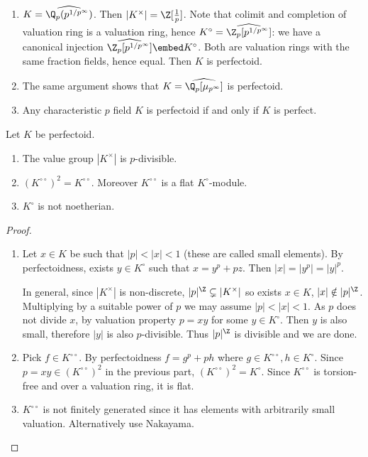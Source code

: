 \documentclass[a4paper]{article}
\begin{document}
\begin{eg}\leavevmode
  \begin{enumerate}
  \item \(K = \widehat{\Q_p(p^{1/p^\infty})}\). Then \(|K^\times| = \Z[\frac{1}{p}]\). Note that colimit and completion of valuation ring is a valuation ring, hence \(K^\circ = \widehat{\Z_p[p^{1/p^\infty}]}\): we have a canonical injection \(\widehat{\Z_p[p^{1/p^\infty}]} \embed K^\circ\). Both are valuation rings with the same fraction fields, hence equal. Then \(K\) is perfectoid.
  \item The same argument shows that \(K = \widehat{\Q_p[\mu_{p^\infty}]}\) is perfectoid.
  \item Any characteristic \(p\) field \(K\) is perfectoid if and only if \(K\) is perfect.
  \end{enumerate}
\end{eg}

\begin{lemma}
  Let \(K\) be perfectoid.
  \begin{enumerate}
  \item The value group \(|K^\times|\) is \(p\)-divisible.
  \item \((K^{\circ \circ})^2 = K^{\circ \circ}\). Moreover \(K^{\circ \circ}\) is a flat \(K^\circ\)-module.
  \item \(K^\circ\) is not noetherian.
  \end{enumerate}
\end{lemma}

\begin{proof}\leavevmode
  \begin{enumerate}
  \item Let \(x \in K\) be such that \(|p| < |x| < 1\) (these are called small elements). By perfectoidness, exists \(y \in K^\circ\) such that \(x = y^p + p z\). Then \(|x| = |y^p| = |y|^p\).

    In general, since \(|K^\times|\) is non-discrete, \(|p|^\Z \subsetneq |K^\times|\) so exists \(x \in K\), \(|x| \notin |p|^\Z\). Multiplying by a suitable power of \(p\) we may assume \(|p| < |x| < 1\). As \(p\) does not divide \(x\), by valuation property \(p = xy\) for some \(y \in K^\circ\). Then \(y\) is also small, therefore \(|y|\) is also \(p\)-divisible. Thus \(|p|^\Z\) is divisible and we are done.
  \item Pick \(f \in K^{\circ \circ}\). By perfectoidness \(f = g^p + p h\) where \(g \in K^{\circ \circ}, h \in K^\circ\). Since \(p = xy \in (K^{\circ \circ})^2\) in the previous part, \((K^{\circ \circ})^2 = K^\circ\). Since \(K^{\circ \circ}\) is torsion-free and over a valuation ring, it is flat.
  \item \(K^{\circ \circ}\) is not finitely generated since it has elements with arbitrarily small valuation. Alternatively use Nakayama.
  \end{enumerate}
\end{proof}
\end{document}
